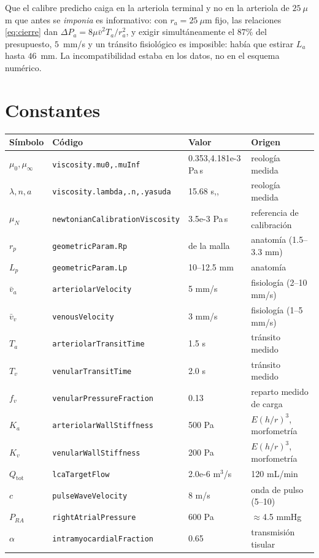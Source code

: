 \documentclass[11pt]{article}
\begin{document}
\noindent
Que el calibre predicho caiga en la arteriola terminal y no en la arteriola de
$25~\mu$m que antes se \emph{imponia} es informativo: con $r_a=25~\mu$m fijo, las
relaciones \eqref{eq:cierre} dan
$\Delta P_a=8\mu\bar v^{2}T_a/r_a^{2}$, y exigir simult\'aneamente el $87\%$ del
presupuesto, $5$~mm/s y un tr\'ansito fisiol\'ogico es imposible: hab\'ia que
estirar $L_a$ hasta $46$~mm. La incompatibilidad estaba en los datos, no en el
esquema num\'erico.

\section{Constantes}

\begin{center}\small
\begin{tabular}{llll}
\toprule
S\'imbolo & C\'odigo & Valor & Origen\\
\midrule
$\mu_0,\mu_\infty$ & \texttt{viscosity.mu0,.muInf} & 0.353,\;4.181e-3 Pa\,s & reolog\'ia medida\\
$\lambda,n,a$ & \texttt{viscosity.lambda,.n,.yasuda} & 15.68 s,\;0.205,\;0.650 & reolog\'ia medida\\
$\mu_N$ & \texttt{newtonianCalibrationViscosity} & 3.5e-3 Pa\,s & referencia de calibraci\'on\\
\midrule
$r_p$ & \texttt{geometricParam.Rp} & de la malla & anatom\'ia (1.5--3.3 mm)\\
$L_p$ & \texttt{geometricParam.Lp} & 10--12.5 mm & anatom\'ia\\
$\bar v_a$ & \texttt{arteriolarVelocity} & 5 mm/s & fisiolog\'ia (2--10 mm/s)\\
$\bar v_v$ & \texttt{venousVelocity} & 3 mm/s & fisiolog\'ia (1--5 mm/s)\\
$T_a$ & \texttt{arteriolarTransitTime} & 1.5 s & tr\'ansito medido\\
$T_v$ & \texttt{venularTransitTime} & 2.0 s & tr\'ansito medido\\
$f_v$ & \texttt{venularPressureFraction} & 0.13 & reparto medido de carga\\
$K_a$ & \texttt{arteriolarWallStiffness} & 500 Pa & $E(h/r)^3$, morfometr\'ia\\
$K_v$ & \texttt{venularWallStiffness} & 200 Pa & $E(h/r)^3$, morfometr\'ia\\
$Q_{\text{tot}}$ & \texttt{lcaTargetFlow} & 2.0e-6 m$^3$/s & 120 mL/min\\
$c$ & \texttt{pulseWaveVelocity} & 8 m/s & onda de pulso (5--10)\\
$P_{RA}$ & \texttt{rightAtrialPressure} & 600 Pa & $\approx$4.5 mmHg\\
$\alpha$ & \texttt{intramyocardialFraction} & 0.65 & transmisi\'on tisular\\
\bottomrule
\end{tabular}
\end{center}
\end{document}
